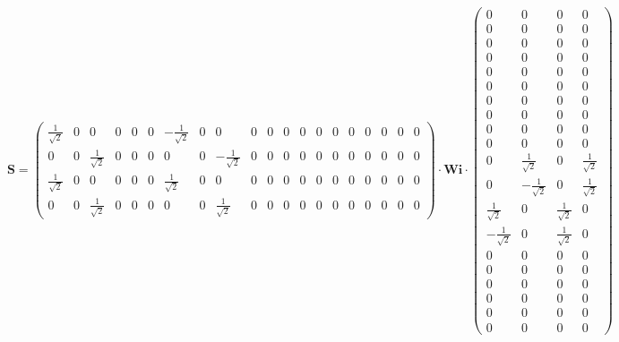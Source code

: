 \[ \mathbf{S} = \left(\begin{array}{cccccccccccccccccccc}
\frac{1}{\sqrt{2}} & 0 & 0 & 0 & 0 & 0 & -\frac{1}{\sqrt{2}} & 0 & 0 &
0 & 0 & 0 & 0 & 0 & 0 & 0 & 0 & 0 & 0 & 0 \\ 0 & 0 &
\frac{1}{\sqrt{2}} & 0 & 0 & 0 & 0 & 0 & -\frac{1}{\sqrt{2}} & 0 & 0 &
0 & 0 & 0 & 0 & 0 & 0 & 0 & 0 & 0 \\ \frac{1}{\sqrt{2}} & 0 & 0 & 0 &
0 & 0 & \frac{1}{\sqrt{2}} & 0 & 0 & 0 & 0 & 0 & 0 & 0 & 0 & 0 & 0 & 0
& 0 & 0 \\ 0 & 0 & \frac{1}{\sqrt{2}} & 0 & 0 & 0 & 0 & 0 &
\frac{1}{\sqrt{2}} & 0 & 0 & 0 & 0 & 0 & 0 & 0 & 0 & 0 & 0 & 0
\end{array}\right) \cdot \mathbf{Wi} \cdot\left(\begin{array}{cccc} 0
& 0 & 0 & 0 \\ 0 & 0 & 0 & 0 \\ 0 & 0 & 0 & 0 \\ 0 & 0 & 0 & 0 \\ 0 &
0 & 0 & 0 \\ 0 & 0 & 0 & 0 \\ 0 & 0 & 0 & 0 \\ 0 & 0 & 0 & 0 \\ 0 & 0
& 0 & 0 \\ 0 & 0 & 0 & 0 \\ 0 & \frac{1}{\sqrt{2}} & 0 &
\frac{1}{\sqrt{2}} \\ 0 & -\frac{1}{\sqrt{2}} & 0 & \frac{1}{\sqrt{2}}
\\ \frac{1}{\sqrt{2}} & 0 & \frac{1}{\sqrt{2}} & 0 \\
-\frac{1}{\sqrt{2}} & 0 & \frac{1}{\sqrt{2}} & 0 \\ 0 & 0 & 0 & 0 \\ 0
& 0 & 0 & 0 \\ 0 & 0 & 0 & 0 \\ 0 & 0 & 0 & 0 \\ 0 & 0 & 0 & 0 \\ 0 &
0 & 0 & 0 \end{array}\right) \]
